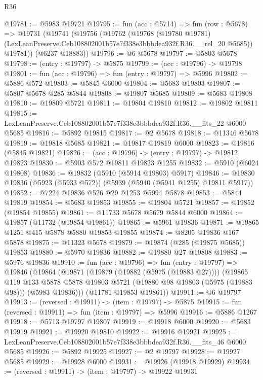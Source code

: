 \begin{lexlean}{R36}
\begin{coremodule}
@19781 := @5983 @19721
@19795 := fun (acc : @5714) =>
  fun (row : @5678) =>
  @19731
    (@19741
      (@19756
        (@19762
          (@19768
            (@19780 @19781)
            (LexLeanPreserve.Ceb108802001b57e7f338e3bbbdea932f.R36.__rel_20 @5685))
          @19781))
      (@6237 @18883))
@19796 := @6 @5678
@19797 := @5803 @5678
@19798 := (entry : @19797) -> @5875
@19799 := (acc : @19796) -> @19798
@19801 := fun (acc : @19796) => fun (entry : @19797) => @5996
@19802 := @5886 @572
@19803 := @5845 @6000
@19804 := @5683 @19803
@19807 := @5807 @5678 @285 @5844
@19808 := @19807 @5685
@19809 := @5683 @19808
@19810 := @19809 @5721
@19811 := @19804 @19810
@19812 := @19802 @19811
@19815 := LexLeanPreserve.Ceb108802001b57e7f338e3bbbdea932f.R36.__fits_22 @6000 @5685
@19816 := @5892 @19815
@19817 := @2 @5678
@19818 := @11346 @5678
@19819 := @19818 @5685
@19821 := @19817 @19819 @6000
@19823 := @19816 (@5845 @19821)
@19826 := (acc : @19796) -> (entry : @19797) -> @19812 @19823
@19830 := @5903 @572 @19811 @19823 @1255
@19832 := @5910 (@6024 @19808)
@19836 := @19832 (@5910 (@5914 @19803) @5917)
@19846 := @19830 @19836 (@5923 (@5933 @572)) (@5939 (@5940 (@5941 @1255) @19811 @5917))
@19852 := @7224 @19836 @526 @29 @1253 @5994 @5878
@19853 := @5844 @19819
@19854 := @5683 @19853
@19855 := @19804 @5721
@19857 := @19852 (@19854 @19855)
@19861 := @11733 @5678 @5679 @5844 @6000
@19864 := @19857 (@11732 (@19854 @19861))
@19865 := @5961 @19836
@19871 := @19865 @1251 @415 @5878 @5880 @19853 @19855
@19874 := @8205 @19836 @167 @5878
@19875 := @11323 @5678
@19879 := @19874 (@285 (@19875 @5685)) @19853
@19880 := @5970 @19836
@19882 := @19880 @27 @19808
@19883 := @5976 @19836
@19910 := fun (acc : @19796) =>
  fun (entry : @19797) =>
  @19846
    (@19864
      (@19871
        (@19879 (@19882 (@5975 (@19883 @27))))
        (@19865
          @119
          @133
          @5878
          @5878
          @19803
          @5721
          (@19880 @98 @19803 (@5975 (@19883 @98)))
          (@5983 @19836)))
      (@11781 @19853 @19861))
@19911 := @6 @19797
@19913 := (reversed : @19911) -> (item : @19797) -> @5875
@19915 := fun (reversed : @19911) => fun (item : @19797) => @5996
@19916 := @5886 @1267
@19918 := @5713 @19797 @19807
@19919 := @19918 @6000
@19920 := @5683 @19919
@19921 := @19920 @19810
@19922 := @19916 @19921
@19925 := LexLeanPreserve.Ceb108802001b57e7f338e3bbbdea932f.R36.__fits_46 @6000 @5685
@19926 := @5892 @19925
@19927 := @2 @19797
@19928 := @19927 @5685
@19929 := @19928 @6000
@19931 := @19926 (@19918 @19929)
@19934 := (reversed : @19911) -> (item : @19797) -> @19922 @19931

\end{coremodule}
\end{lexlean}
